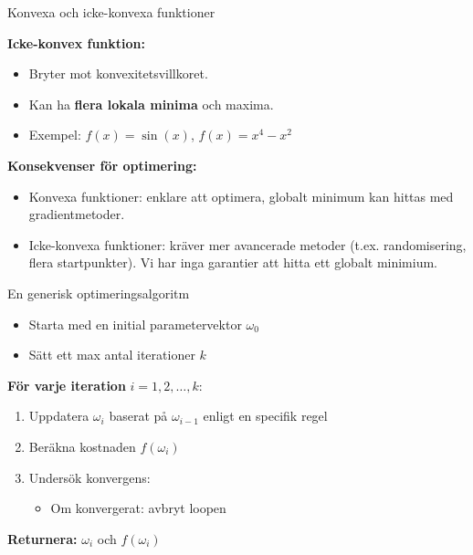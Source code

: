 \documentclass[10pt,english]{beamer}
\begin{document}
\begin{frame}{Konvexa och icke-konvexa funktioner}

    \textbf{Icke-konvex funktion:}
    \begin{itemize}
        \item Bryter mot konvexitetsvillkoret.
        \item Kan ha \textbf{flera lokala minima} och maxima.
        \item Exempel: $f(x) = \sin(x)$, $f(x) = x^4 - x^2$
    \end{itemize}

    \vspace{0.3cm}
    \textbf{Konsekvenser för optimering:}
    \begin{itemize}
        \item Konvexa funktioner: enklare att optimera, globalt minimum kan hittas med gradientmetoder.
        \item Icke-konvexa funktioner: kräver mer avancerade metoder (t.ex. randomisering, flera startpunkter). Vi har inga garantier att hitta ett globalt minimium.
    \end{itemize}
\end{frame}


\begin{frame}{En generisk optimeringsalgoritm}
  \begin{itemize}
    \item Starta med en initial parametervektor \( \omega_0 \)
    \item Sätt ett max antal iterationer \( k \)
  \end{itemize}

  \vspace{1em}
  \textbf{För varje iteration } \( i = 1, 2, \dots, k \):
  \begin{enumerate}
    \item Uppdatera \( \omega_i \) baserat på \( \omega_{i-1} \) enligt en specifik regel
    \item Beräkna kostnaden \( f\left(\omega_i\right) \)
    \item Undersök konvergens:
    \begin{itemize}
      \item Om konvergerat: avbryt loopen
    \end{itemize}
  \end{enumerate}

  \vspace{0.5em}
  \textbf{Returnera:} \( \omega_i \) och \( f\left(\omega_i\right) \)
\end{frame}
\end{document}
